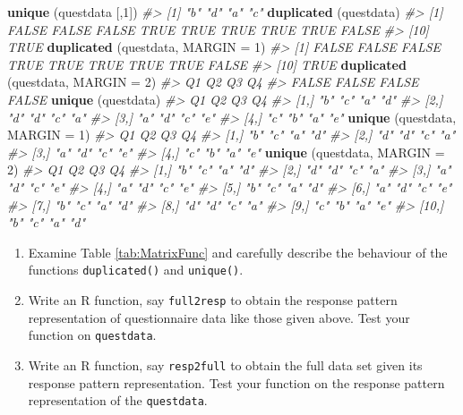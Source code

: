 \documentclass[
]{book}
\newenvironment{Shaded}{\begin{snugshade}}{\end{snugshade}}
\newcommand{\AttributeTok}[1]{\textcolor[rgb]{0.13,0.29,0.53}{#1}}
\newcommand{\CommentTok}[1]{\textcolor[rgb]{0.56,0.35,0.01}{\textit{#1}}}
\newcommand{\DecValTok}[1]{\textcolor[rgb]{0.00,0.00,0.81}{#1}}
\newcommand{\FunctionTok}[1]{\textcolor[rgb]{0.13,0.29,0.53}{\textbf{#1}}}
\newcommand{\NormalTok}[1]{#1}
\begin{document}
\begin{Shaded}
\begin{Highlighting}[]
\FunctionTok{unique}\NormalTok{ (questdata [,}\DecValTok{1}\NormalTok{])}
\CommentTok{\#\textgreater{} [1] "b" "d" "a" "c"}
\FunctionTok{duplicated}\NormalTok{ (questdata)}
\CommentTok{\#\textgreater{}  [1] FALSE FALSE FALSE  TRUE  TRUE  TRUE  TRUE  TRUE FALSE}
\CommentTok{\#\textgreater{} [10]  TRUE}
\FunctionTok{duplicated}\NormalTok{ (questdata, }\AttributeTok{MARGIN =} \DecValTok{1}\NormalTok{)}
\CommentTok{\#\textgreater{}  [1] FALSE FALSE FALSE  TRUE  TRUE  TRUE  TRUE  TRUE FALSE}
\CommentTok{\#\textgreater{} [10]  TRUE}
\FunctionTok{duplicated}\NormalTok{ (questdata, }\AttributeTok{MARGIN =} \DecValTok{2}\NormalTok{)}
\CommentTok{\#\textgreater{}    Q1    Q2    Q3    Q4 }
\CommentTok{\#\textgreater{} FALSE FALSE FALSE FALSE}
\FunctionTok{unique}\NormalTok{ (questdata)}
\CommentTok{\#\textgreater{}      Q1  Q2  Q3  Q4 }
\CommentTok{\#\textgreater{} [1,] "b" "c" "a" "d"}
\CommentTok{\#\textgreater{} [2,] "d" "d" "c" "a"}
\CommentTok{\#\textgreater{} [3,] "a" "d" "c" "e"}
\CommentTok{\#\textgreater{} [4,] "c" "b" "a" "e"}
\FunctionTok{unique}\NormalTok{ (questdata, }\AttributeTok{MARGIN =} \DecValTok{1}\NormalTok{)}
\CommentTok{\#\textgreater{}      Q1  Q2  Q3  Q4 }
\CommentTok{\#\textgreater{} [1,] "b" "c" "a" "d"}
\CommentTok{\#\textgreater{} [2,] "d" "d" "c" "a"}
\CommentTok{\#\textgreater{} [3,] "a" "d" "c" "e"}
\CommentTok{\#\textgreater{} [4,] "c" "b" "a" "e"}
\FunctionTok{unique}\NormalTok{ (questdata, }\AttributeTok{MARGIN =} \DecValTok{2}\NormalTok{)}
\CommentTok{\#\textgreater{}       Q1  Q2  Q3  Q4 }
\CommentTok{\#\textgreater{}  [1,] "b" "c" "a" "d"}
\CommentTok{\#\textgreater{}  [2,] "d" "d" "c" "a"}
\CommentTok{\#\textgreater{}  [3,] "a" "d" "c" "e"}
\CommentTok{\#\textgreater{}  [4,] "a" "d" "c" "e"}
\CommentTok{\#\textgreater{}  [5,] "b" "c" "a" "d"}
\CommentTok{\#\textgreater{}  [6,] "a" "d" "c" "e"}
\CommentTok{\#\textgreater{}  [7,] "b" "c" "a" "d"}
\CommentTok{\#\textgreater{}  [8,] "d" "d" "c" "a"}
\CommentTok{\#\textgreater{}  [9,] "c" "b" "a" "e"}
\CommentTok{\#\textgreater{} [10,] "b" "c" "a" "d"}
\end{Highlighting}
\end{Shaded}

\begin{enumerate}
\def\labelenumi{(\roman{enumi})}
\setcounter{enumi}{1}
\item
  Examine Table \ref{tab:MatrixFunc} and carefully describe the behaviour of the functions \texttt{duplicated()} and \texttt{unique()}.
\item
  Write an R function, say \texttt{full2resp} to obtain the response pattern representation of questionnaire data like those given above. Test your function on \texttt{questdata}.
\item
  Write an R function, say \texttt{resp2full} to obtain the full data set given its response pattern representation. Test your function on the response pattern representation of the \texttt{questdata}.
\end{enumerate}
\end{document}
